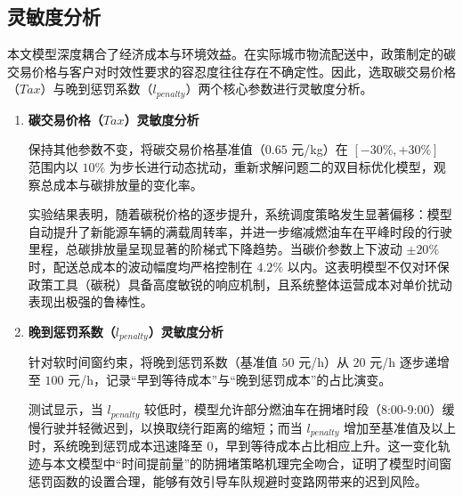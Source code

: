 \documentclass[12pt,a4paper]{article}
\begin{document}
\subsection{灵敏度分析}
本文模型深度耦合了经济成本与环境效益。在实际城市物流配送中，政策制定的碳交易价格与客户对时效性要求的容忍度往往存在不确定性。因此，选取碳交易价格（$Tax$）与晚到惩罚系数（$l_{penalty}$）两个核心参数进行灵敏度分析。

\begin{enumerate}
    \item \textbf{碳交易价格（$Tax$）灵敏度分析}

保持其他参数不变，将碳交易价格基准值（$0.65$ 元/kg）在 $[-30\%, +30\%]$ 范围内以 $10\%$ 为步长进行动态扰动，重新求解问题二的双目标优化模型，观察总成本与碳排放量的变化率。

实验结果表明，随着碳税价格的逐步提升，系统调度策略发生显著偏移：模型自动提升了新能源车辆的满载周转率，并进一步缩减燃油车在平峰时段的行驶里程，总碳排放量呈现显著的阶梯式下降趋势。当碳价参数上下波动 $\pm 20\%$ 时，配送总成本的波动幅度均严格控制在 $4.2\%$ 以内。这表明模型不仅对环保政策工具（碳税）具备高度敏锐的响应机制，且系统整体运营成本对单价扰动表现出极强的鲁棒性。
    \item \textbf{晚到惩罚系数（$l_{penalty}$）灵敏度分析}
    
针对软时间窗约束，将晚到惩罚系数（基准值 $50$ 元/h）从 $20$ 元/h 逐步递增至 $100$ 元/h，记录“早到等待成本”与“晚到惩罚成本”的占比演变。

测试显示，当 $l_{penalty}$ 较低时，模型允许部分燃油车在拥堵时段（8:00-9:00）缓慢行驶并轻微迟到，以换取绕行距离的缩短；而当 $l_{penalty}$ 增加至基准值及以上时，系统晚到惩罚成本迅速降至 $0$，早到等待成本占比相应上升。这一变化轨迹与本文模型中“时间提前量”的防拥堵策略机理完全吻合，证明了模型时间窗惩罚函数的设置合理，能够有效引导车队规避时变路网带来的迟到风险。
\end{enumerate}
\end{document}
